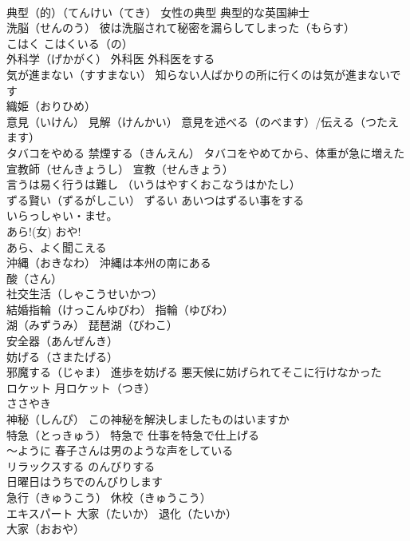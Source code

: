 \documentclass[8pt]{extreport}
\begin{document}
\begin{CJK}{UTF8}{min}
\\	典型（的）（てんけい（てき） 女性の典型 典型的な英国紳士
\\	洗脳（せんのう） 彼は洗脳されて秘密を漏らしてしまった（もらす）
\\	こはく こはくいる（の）
\\	外科学（げかがく） 外科医 外科医をする
\\	気が進まない（すすまない） 知らない人ばかりの所に行くのは気が進まないです
\\	織姫（おりひめ）
\\	意見（いけん） 見解（けんかい） 意見を述べる（のべます）/伝える（つたえます）
\\	タバコをやめる 禁煙する（きんえん） タバコをやめてから、体重が急に増えた
\\	宣教師（せんきょうし） 宣教（せんきょう）
\\	言うは易く行うは難し （いうはやすくおこなうはかたし）
\\	ずる賢い（ずるがしこい） ずるい あいつはずるい事をする
\\	いらっしゃい・ませ。
\\	あら!(女) おや! 
\\	あら、よく聞こえる
\\	沖縄（おきなわ） 沖縄は本州の南にある
\\	酸（さん）
\\	社交生活（しゃこうせいかつ）
\\	結婚指輪（けっこんゆびわ） 指輪（ゆびわ）
\\	湖（みずうみ） 琵琶湖（びわこ）
\\	安全器（あんぜんき）
\\	妨げる（さまたげる）
\\	邪魔する（じゃま） 進歩を妨げる 悪天候に妨げられてそこに行けなかった
\\	ロケット 月ロケット（つき）
\\	ささやき
\\	神秘（しんぴ） この神秘を解決しましたものはいますか
\\	特急（とっきゅう） 特急で 仕事を特急で仕上げる
\\	～ように 春子さんは男のような声をしている
\\	リラックスする のんびりする　
\\	日曜日はうちでのんびりします
\\	急行（きゅうこう） 休校（きゅうこう） 
\\	エキスパート 大家（たいか） 退化（たいか） 
\\	大家（おおや）

\end{CJK}
\end{document}
